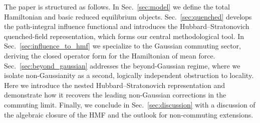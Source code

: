 The paper is structured as follows. In Sec.~\ref{sec:model} we define the total Hamiltonian and basic reduced equilibrium objects. Sec.~\ref{sec:quenched} develops the path-integral influence functional and introduces the Hubbard--Stratonovich quenched-field representation, which forms our central methodological tool. In Sec.~\ref{sec:influence_to_hmf} we specialize to the Gaussian commuting sector, deriving the closed operator form for the Hamiltonian of mean force. Sec.~\ref{sec:beyond_gaussian} addresses the beyond-Gaussian regime, where we isolate non-Gaussianity as a second, logically independent obstruction to locality. Here we introduce the nested Hubbard--Stratonovich representation and demonstrate how it recovers the leading non-Gaussian corrections in the commuting limit. Finally, we conclude in Sec.~\ref{sec:discussion} with a discussion of the algebraic closure of the HMF and the outlook for non-commuting extensions.


